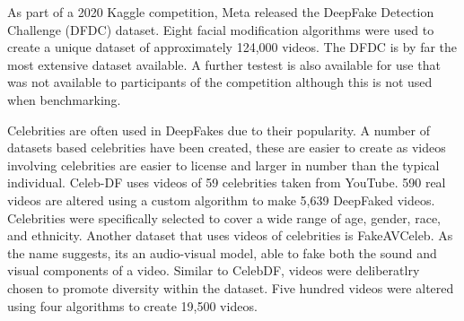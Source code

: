As part of a 2020 Kaggle competition, Meta released the DeepFake Detection Challenge (DFDC) dataset\cite{dolhansky2020deepfake}. Eight facial modification algorithms were used to create a unique dataset of approximately 124,000 videos. The DFDC is by far the most extensive dataset available. A further testest is also available for use that was not available to participants of the competition although this is not used when benchmarking.

Celebrities are often used in DeepFakes due to their popularity. A number of datasets based celebrities have been created, these are easier to create as videos involving celebrities are easier to license and larger in number than the typical individual. Celeb-DF\cite{li2020celeb} uses videos of 59 celebrities taken from YouTube. 590 real videos are altered using a custom algorithm to make 5,639 DeepFaked videos. Celebrities were specifically selected to cover a wide range of age, gender, race, and ethnicity. Another dataset that uses videos of celebrities is FakeAVCeleb\cite{khalid2021fakeavceleb}. As the name suggests, its an audio-visual model, able to fake both the sound and visual components of a video. Similar to CelebDF, videos were deliberatlry chosen to promote diversity within the dataset. Five hundred videos were altered using four algorithms to create 19,500 videos.